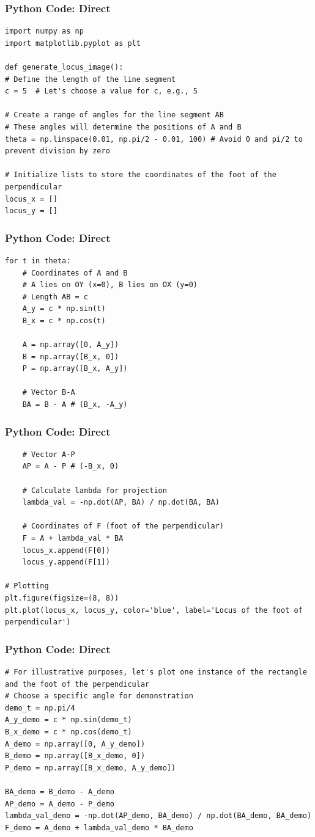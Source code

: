 \documentclass{beamer}
\begin{document}
\begin{frame}[fragile]
\frametitle{Python Code: Direct}
\begin{lstlisting}
import numpy as np
import matplotlib.pyplot as plt

def generate_locus_image():
# Define the length of the line segment
c = 5  # Let's choose a value for c, e.g., 5

# Create a range of angles for the line segment AB
# These angles will determine the positions of A and B
theta = np.linspace(0.01, np.pi/2 - 0.01, 100) # Avoid 0 and pi/2 to prevent division by zero

# Initialize lists to store the coordinates of the foot of the perpendicular
locus_x = []
locus_y = []
\end{lstlisting}
\end{frame}

\begin{frame}[fragile]
\frametitle{Python Code: Direct}
\begin{lstlisting}
for t in theta:
    # Coordinates of A and B
    # A lies on OY (x=0), B lies on OX (y=0)
    # Length AB = c
    A_y = c * np.sin(t)
    B_x = c * np.cos(t)

    A = np.array([0, A_y])
    B = np.array([B_x, 0])
    P = np.array([B_x, A_y])

    # Vector B-A
    BA = B - A # (B_x, -A_y)
\end{lstlisting}
\end{frame}

\begin{frame}[fragile]
\frametitle{Python Code: Direct}
\begin{lstlisting}
    # Vector A-P
    AP = A - P # (-B_x, 0)

    # Calculate lambda for projection
    lambda_val = -np.dot(AP, BA) / np.dot(BA, BA)
    
    # Coordinates of F (foot of the perpendicular)
    F = A + lambda_val * BA
    locus_x.append(F[0])
    locus_y.append(F[1])

# Plotting
plt.figure(figsize=(8, 8))
plt.plot(locus_x, locus_y, color='blue', label='Locus of the foot of perpendicular')
\end{lstlisting}
\end{frame}

\begin{frame}[fragile]
\frametitle{Python Code: Direct}
\begin{lstlisting}
# For illustrative purposes, let's plot one instance of the rectangle and the foot of the perpendicular
# Choose a specific angle for demonstration
demo_t = np.pi/4
A_y_demo = c * np.sin(demo_t)
B_x_demo = c * np.cos(demo_t)
A_demo = np.array([0, A_y_demo])
B_demo = np.array([B_x_demo, 0])
P_demo = np.array([B_x_demo, A_y_demo])

BA_demo = B_demo - A_demo
AP_demo = A_demo - P_demo
lambda_val_demo = -np.dot(AP_demo, BA_demo) / np.dot(BA_demo, BA_demo)
F_demo = A_demo + lambda_val_demo * BA_demo
\end{lstlisting}
\end{frame}
\end{document}
